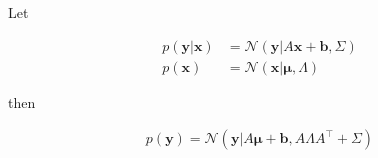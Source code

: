 \begin{lemma}

    Let

    \begin{align*}
        p(\mathbf{y}|\mathbf{x})&=\mathcal{N}(\mathbf{y}|A\mathbf{x}+\mathbf{b},\Sigma)\\
        p(\mathbf{x})&=\mathcal{N}(\mathbf{x}|\boldsymbol{\mu},\Lambda)
    \end{align*}

    \noindent then

    \begin{align*}
        p(\mathbf{y})=\mathcal{N}(\mathbf{y}|A\boldsymbol{\mu}+\mathbf{b},A\Lambda A^\intercal+\Sigma)
    \end{align*}
    \label{lemma:linearModelGaussianLatents}
\end{lemma}

